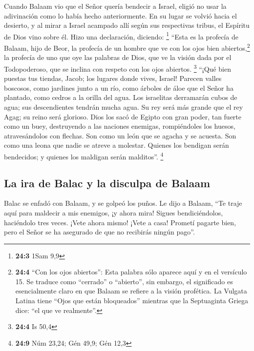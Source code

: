  Cuando Balaam vio que el Señor quería bendecir a Israel,
eligió no usar la adivinación como lo había hecho anteriormente. En su
lugar se volvió hacia el desierto,  y al mirar a Israel
acampado allí según sus respectivas tribus, el Espíritu de Dios vino
sobre él.  Hizo una declaración, diciendo: \footnote{\textbf{24:3}
  1Sam 9,9}  ``Esta es la profecía de Balaam, hijo de
Beor, la profecía de un hombre que ve con los ojos bien
abiertos,\footnote{\textbf{24:4} ``Con los ojos abiertos'': Esta palabra
  sólo aparece aquí y en el versículo 15. Se traduce como ``cerrado'' o
  ``abierto'', sin embargo, el significado es esencialmente claro en que
  Balaam se refiere a la visión profética. La Vulgata Latina tiene
  ``Ojos que están bloqueados'' mientras que la Septuaginta Griega dice:
  ``el que ve realmente''.} la profecía de uno que oye las palabras de
Dios, que ve la visión dada por el Todopoderoso, que se inclina con
respeto con los ojos abiertos. \footnote{\textbf{24:4} Is 50,4}
 ``¡Qué bien puestas tus tiendas, Jacob; los lugares donde
vives, Israel!  Parecen valles boscosos, como jardines
junto a un río, como árboles de áloe que el Señor ha plantado, como
cedros a la orilla del agua.  Los israelitas derramarán
cubos de agua; sus descendientes tendrán mucha agua. Su rey será más
grande que el rey Agag; su reino será glorioso.  Dios los
sacó de Egipto con gran poder, tan fuerte como un buey, destruyendo a
las naciones enemigas, rompiéndoles los huesos, atravesándolos con
flechas.  Son como un león que se agacha y se acuesta. Son
como una leona que nadie se atreve a molestar. Quienes los bendigan
serán bendecidos; y quienes los maldigan serán malditos''. \footnote{\textbf{24:9}
  Núm 23,24; Gén 49,9; Gén 12,3}

\hypertarget{la-ira-de-balac-y-la-disculpa-de-balaam}{%
\subsection{La ira de Balac y la disculpa de
Balaam}\label{la-ira-de-balac-y-la-disculpa-de-balaam}}

 Balac se enfadó con Balaam, y se golpeó los puños. Le
dijo a Balaam, ``Te traje aquí para maldecir a mis enemigos, ¡y ahora
mira! Sigues bendiciéndolos, haciéndolo tres veces. 
¡Vete ahora mismo! ¡Vete a casa! Prometí pagarte bien, pero el Señor se
ha asegurado de que no recibirás ningún pago''.

